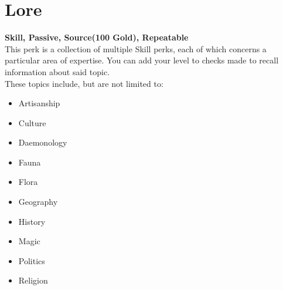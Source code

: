 \section{Lore}\label{sec:lore}
\textbf{Skill, Passive, Source(100 Gold), Repeatable}\\
This perk is a collection of multiple Skill perks, each of which concerns a particular area of expertise. You can add your level to checks made to recall information about said topic.\\
These topics include, but are not limited to:\\

\begin{itemize}
\item Artisanship
\item Culture
\item Daemonology
\item Fauna
\item Flora
\item Geography
\item History
\item Magic
\item Politics
\item Religion
\end{itemize}